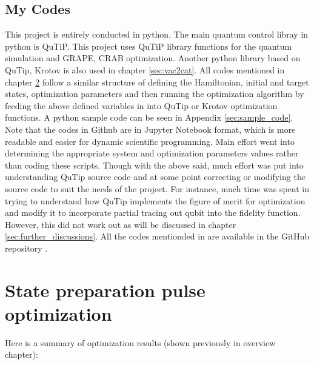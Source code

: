 \documentclass[12pt]{report}
\begin{document}
\section{My Codes}
This project is entirely conducted in python. The main quantum control libray in python is QuTiP.
This project uses QuTiP library functions for the quantum simulation and GRAPE, CRAB optimization.
Another python library based on QuTip, Krotov is also used in chapter \ref{sec:vac2cat}.
All codes mentioned in chapter \ref{sec:state_preparation} follow a similar structure of defining the Hamiltonian, initial and target states, optimization parameters and then running the optimization algorithm by feeding the above defined variables in into QuTip or Krotov optimization functions. 
A python sample code can be seen in Appendix \ref{sec:sample_code}. Note that the codes in Github are in Jupyter Notebook format, which is more readable and easier for dynamic scientific programming.
Main effort went into determining the appropriate system and optimization parameters values rather than coding these scripts. 
Though with the above said, much effort was put into understanding QuTip source code and at some point correcting or modifying the source code to suit the needs of the project.
For instance, much time was spent in trying to understand how QuTip implements the figure of merit for optimization and modify it to incorporate partial tracing out qubit into the fidelity function. 
However, this did not work out as will be discussed in chapter \ref{sec:further_discussions}.
All the codes mentionded in are available in the GitHub repository \cite{lzl_github_repo}.

\chapter{State preparation pulse optimization}\label{sec:state_preparation}
Here is a summary of optimization results (shown previously in overview chapter): 
\end{document}
